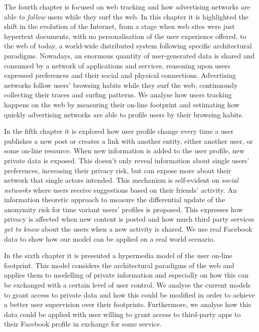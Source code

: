 The fourth chapter is focused on web tracking and how advertising networks are able \emph{to follow} users while they surf the web. In this chapter it is highlighted the shift in the evolution of the Internet, from a stage when web sites were just hypertext documents, with no personalisation of the user experience offered, to the web of today, a world-wide distributed system following specific architectural paradigms. Nowadays, an enormous quantity of user-generated data is shared and consumed by a network of applications and services, reasoning upon users expressed preferences and their social and physical connections. Advertising networks follow users’ browsing habits while they surf the web, continuously collecting their traces and surfing patterns. We analyse how users tracking happens on the web by measuring their on-line footprint and estimating how quickly advertising networks are able to profile users by their browsing habits.

In the fifth chapter it is explored how user profile change every time a user publishes a new post or creates a link with another entity, either another user, or some on-line resource. When new information is added to the user profile, new private data is exposed. This doesn't only reveal information about single users' preferences, increasing their privacy risk, but can expose more about their network that single actors intended. This mechanism is self-evident on \emph{social networks} where users receive suggestions based on their friends’ activity. An information theoretic approach to measure the differential update of the anonymity risk for time variant users’ profiles is proposed. This expresses how privacy is affected when new content is posted and how much third party services \emph{get to know} about the users when a new activity is shared. We use real Facebook data to show how our model can be applied on a real world scenario.

In the sixth chapter it is presented a hypermedia model of the user on-line footprint. This model considers the architectural paradigms of the web and applies them to modelling of private information and especially on how this can be exchanged with a certain level of user control. We analyse the current models to grant access to private data and how this could be modified in order to achieve a better user supervision over their footprints. Furthermore, we analyse how this data could be applied with user willing to grant access to third-party apps to their Facebook profile in exchange for some service.